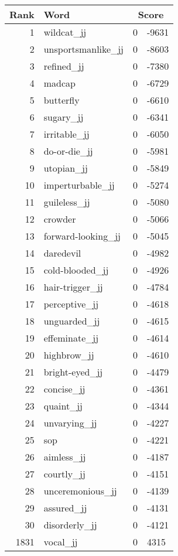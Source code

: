 \begin{longtable}[!htbp]{| rlr@{.}l |}
    \hline
    \textbf{Rank} & \textbf{Word} & \multicolumn{2}{c|}{\textbf{Score}} \\
    \hline
    \endhead
    1 & wildcat\_jj & 0 & -9631 \\
    2 & unsportsmanlike\_jj & 0 & -8603 \\
    3 & refined\_jj & 0 & -7380 \\
    4 & madcap & 0 & -6729 \\
    5 & butterfly & 0 & -6610 \\
    6 & sugary\_jj & 0 & -6341 \\
    7 & irritable\_jj & 0 & -6050 \\
    8 & do-or-die\_jj & 0 & -5981 \\
    9 & utopian\_jj & 0 & -5849 \\
    10 & imperturbable\_jj & 0 & -5274 \\
    11 & guileless\_jj & 0 & -5080 \\
    12 & crowder & 0 & -5066 \\
    13 & forward-looking\_jj & 0 & -5045 \\
    14 & daredevil & 0 & -4982 \\
    15 & cold-blooded\_jj & 0 & -4926 \\
    16 & hair-trigger\_jj & 0 & -4784 \\
    17 & perceptive\_jj & 0 & -4618 \\
    18 & unguarded\_jj & 0 & -4615 \\
    19 & effeminate\_jj & 0 & -4614 \\
    20 & highbrow\_jj & 0 & -4610 \\
    21 & bright-eyed\_jj & 0 & -4479 \\
    22 & concise\_jj & 0 & -4361 \\
    23 & quaint\_jj & 0 & -4344 \\
    24 & unvarying\_jj & 0 & -4227 \\
    25 & sop & 0 & -4221 \\
    26 & aimless\_jj & 0 & -4187 \\
    27 & courtly\_jj & 0 & -4151 \\
    28 & unceremonious\_jj & 0 & -4139 \\
    29 & assured\_jj & 0 & -4131 \\
    30 & disorderly\_jj & 0 & -4121 \\
    1831 & vocal\_jj & 0 & 4315 \\

\end{longtable}
